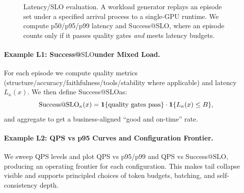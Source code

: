 \documentclass[11pt]{article}
\newcommand{\slo}{\ensuremath{\mathrm{SLO}}}
\begin{document}
\begin{figure}[t]
\centering
{}
\caption{Latency/SLO evaluation.
A workload generator replays an episode set under a specified arrival process to a single-GPU runtime.
We compute p50/p95/p99 latency and Success@\slo, where an episode counts only if it passes quality gates \emph{and} meets latency budgets.}
\label{fig:slo-eval}
\end{figure}

\paragraph{Example L1: Success@\slo under Mixed Load.}
For each episode we compute quality metrics (structure/accuracy/faithfulness/tools/stability where applicable) and latency $L_\kappa(x)$.
We then define Success@\slo as:
\[
\text{Success@\slo}_\kappa(x)=
\mathbf{1}\{\text{quality gates pass}\}\cdot \mathbf{1}\{L_\kappa(x)\le B\},
\]
and aggregate to get a business-aligned “good and on-time” rate.

\paragraph{Example L2: QPS vs p95 Curves and Configuration Frontier.}
We sweep QPS levels and plot QPS vs p95/p99 and QPS vs Success@\slo, producing an operating frontier for each configuration.
This makes tail collapse visible and supports principled choices of token budgets, batching, and self-consistency depth.
\end{document}
